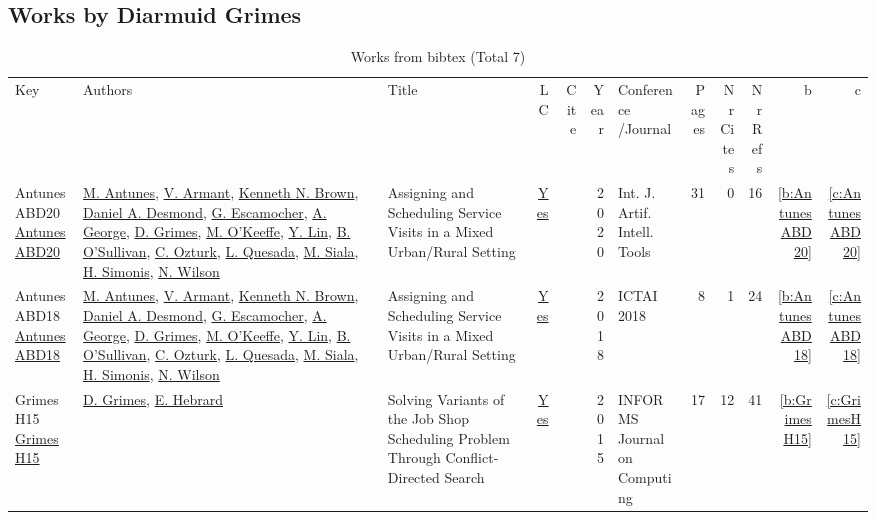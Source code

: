 \subsection{Works by Diarmuid Grimes}
\label{sec:a183}
{\scriptsize
\begin{longtable}{>{\raggedright\arraybackslash}p{3cm}>{\raggedright\arraybackslash}p{6cm}>{\raggedright\arraybackslash}p{6.5cm}rrrp{2.5cm}rrrrr}
\rowcolor{white}\caption{Works from bibtex (Total 7)}\\ \toprule
\rowcolor{white}Key & Authors & Title & LC & Cite & Year & \shortstack{Conference\\/Journal} & Pages & \shortstack{Nr\\Cites} & \shortstack{Nr\\Refs} & b & c \\ \midrule\endhead
\bottomrule
\endfoot
AntunesABD20 \href{https://doi.org/10.1142/S0218213020600076}{AntunesABD20} & \hyperref[auth:a891]{M. Antunes}, \hyperref[auth:a892]{V. Armant}, \hyperref[auth:a223]{Kenneth N. Brown}, \hyperref[auth:a893]{Daniel A. Desmond}, \hyperref[auth:a894]{G. Escamocher}, \hyperref[auth:a895]{A. George}, \hyperref[auth:a183]{D. Grimes}, \hyperref[auth:a896]{M. O'Keeffe}, \hyperref[auth:a897]{Y. Lin}, \hyperref[auth:a16]{B. O'Sullivan}, \hyperref[auth:a898]{C. Ozturk}, \hyperref[auth:a899]{L. Quesada}, \hyperref[auth:a130]{M. Siala}, \hyperref[auth:a17]{H. Simonis}, \hyperref[auth:a838]{N. Wilson} & Assigning and Scheduling Service Visits in a Mixed Urban/Rural Setting & \href{works/AntunesABD20.pdf}{Yes} & \cite{AntunesABD20} & 2020 & Int. J. Artif. Intell. Tools & 31 & 0 & 16 & \ref{b:AntunesABD20} & \ref{c:AntunesABD20}\\
AntunesABD18 \href{https://doi.org/10.1109/ICTAI.2018.00027}{AntunesABD18} & \hyperref[auth:a891]{M. Antunes}, \hyperref[auth:a892]{V. Armant}, \hyperref[auth:a223]{Kenneth N. Brown}, \hyperref[auth:a893]{Daniel A. Desmond}, \hyperref[auth:a894]{G. Escamocher}, \hyperref[auth:a895]{A. George}, \hyperref[auth:a183]{D. Grimes}, \hyperref[auth:a896]{M. O'Keeffe}, \hyperref[auth:a897]{Y. Lin}, \hyperref[auth:a16]{B. O'Sullivan}, \hyperref[auth:a898]{C. Ozturk}, \hyperref[auth:a899]{L. Quesada}, \hyperref[auth:a130]{M. Siala}, \hyperref[auth:a17]{H. Simonis}, \hyperref[auth:a838]{N. Wilson} & Assigning and Scheduling Service Visits in a Mixed Urban/Rural Setting & \href{works/AntunesABD18.pdf}{Yes} & \cite{AntunesABD18} & 2018 & ICTAI 2018 & 8 & 1 & 24 & \ref{b:AntunesABD18} & \ref{c:AntunesABD18}\\
GrimesH15 \href{https://doi.org/10.1287/ijoc.2014.0625}{GrimesH15} & \hyperref[auth:a183]{D. Grimes}, \hyperref[auth:a1]{E. Hebrard} & Solving Variants of the Job Shop Scheduling Problem Through Conflict-Directed Search & \href{works/GrimesH15.pdf}{Yes} & \cite{GrimesH15} & 2015 & INFORMS Journal on Computing & 17 & 12 & 41 & \ref{b:GrimesH15} & \ref{c:GrimesH15}\\

\end{longtable}}
